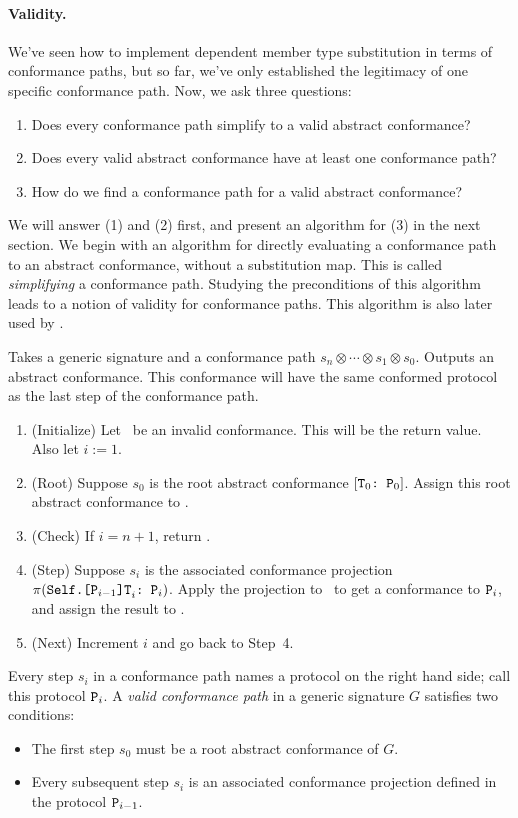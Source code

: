 \documentclass[../generics]{subfiles}
\begin{document}
\paragraph{Validity.} We've seen how to implement dependent member type substitution in terms of conformance paths, but so far, we've only established the legitimacy of one specific conformance path. Now, we ask three questions:
\begin{enumerate}
\item Does every conformance path simplify to a valid abstract conformance?
\item Does every valid abstract conformance have at least one conformance path?
\item How do we find a conformance path for a valid abstract conformance?
\end{enumerate}
We will answer (1) and (2) first, and present an algorithm for (3) in the next section. We begin with an algorithm for directly evaluating a conformance path to an abstract conformance, without a substitution map. This is called \emph{simplifying} a conformance path. Studying the preconditions of this algorithm leads to a notion of validity for conformance paths. This algorithm is also later used by .
\begin{algorithm}\label{invertconformancepath}
Takes a generic signature and a conformance path $s_n\otimes\cdots\otimes s_1\otimes s_0$. Outputs an abstract conformance. This conformance will have the same conformed protocol as the last step of the conformance path.
\begin{enumerate}
\item (Initialize) Let \nC\ be an invalid conformance. This will be the return value. Also let $i := 1$.
\item (Root) Suppose $s_0$ is the root abstract conformance $[\texttt{$\texttt{T}_0$:~$\texttt{P}_0$}]$. Assign this root abstract conformance to \nC.
\item (Check) If $i=n+1$, return \nC.
\item (Step) Suppose $s_i$ is the associated conformance projection $\pi(\texttt{$\texttt{Self.[$\texttt{P}_{i-1}$]T}_i$:~$\texttt{P}_i$})$. Apply the projection to \nC\ to get a conformance to $\texttt{P}_i$, and assign the result to \nC.
\item (Next) Increment $i$ and go back to Step~4.
\end{enumerate}
\end{algorithm}

Every step $s_i$ in a conformance path names a protocol on the right hand side; call this protocol $\texttt{P}_i$. A \emph{valid conformance path} in a generic signature $G$ satisfies two conditions:
\begin{itemize}
\item The first step $s_0$ must be a root abstract conformance of $G$.
\item Every subsequent step $s_i$ is an associated conformance projection defined in the protocol $\texttt{P}_{i-1}$.
\end{itemize}
\end{document}
